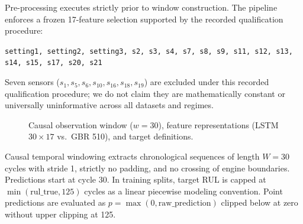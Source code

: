Pre-processing executes strictly prior to window construction. The pipeline enforces a frozen 17-feature selection supported by the recorded qualification procedure:
\begin{center}
\texttt{setting1, setting2, setting3, s2, s3, s4, s7, s8, s9, s11, s12, s13, s14, s15, s17, s20, s21}
\end{center}
Seven sensors ($s_1, s_5, s_6, s_{10}, s_{16}, s_{18}, s_{19}$) are excluded under this recorded qualification procedure; we do not claim they are mathematically constant or universally uninformative across all datasets and regimes.

\begin{figure}[htbp]
\centering
\resizebox{\columnwidth}{!}{}
\caption{Causal observation window ($w=30$), feature representations (LSTM $30 \times 17$ vs.\ GBR 510), and target definitions.}
\label{fig:causal_window}
\end{figure}

Causal temporal windowing extracts chronological sequences of length $W=30$ cycles with stride 1, strictly no padding, and no crossing of engine boundaries. Predictions start at cycle 30. In training splits, target RUL is capped at $\min(\text{rul\_true}, 125)$ cycles as a linear piecewise modeling convention. Point predictions are evaluated as $p = \max(0, \text{raw\_prediction})$ clipped below at zero without upper clipping at 125.

